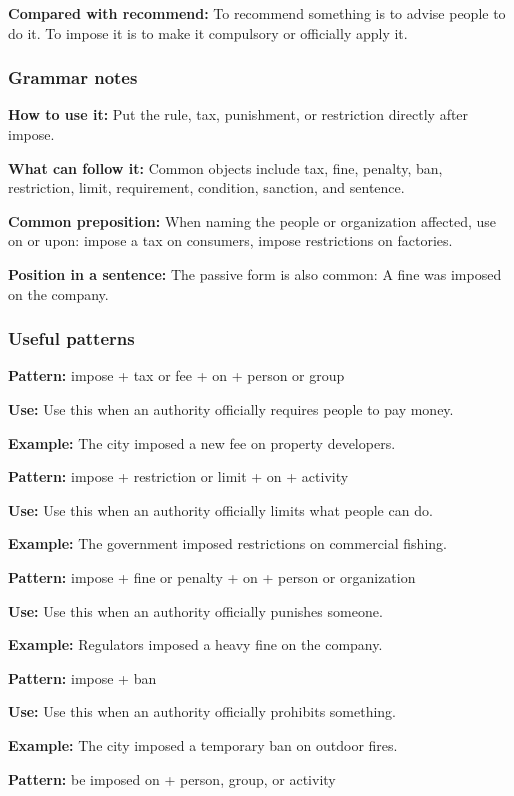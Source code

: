 \documentclass[11pt]{article}
\begin{document}
\textbf{Compared with recommend:} To recommend something is to advise people to do it. To impose it is to make it compulsory or officially apply it.

\subsubsection{Grammar notes}
\textbf{How to use it:} Put the rule, tax, punishment, or restriction directly after impose.

\textbf{What can follow it:} Common objects include tax, fine, penalty, ban, restriction, limit, requirement, condition, sanction, and sentence.

\textbf{Common preposition:} When naming the people or organization affected, use on or upon: impose a tax on consumers, impose restrictions on factories.

\textbf{Position in a sentence:} The passive form is also common: A fine was imposed on the company.

\subsubsection{Useful patterns}
\textbf{Pattern:} impose + tax or fee + on + person or group

\textbf{Use:} Use this when an authority officially requires people to pay money.

\textbf{Example:} The city imposed a new fee on property developers.

\textbf{Pattern:} impose + restriction or limit + on + activity

\textbf{Use:} Use this when an authority officially limits what people can do.

\textbf{Example:} The government imposed restrictions on commercial fishing.

\textbf{Pattern:} impose + fine or penalty + on + person or organization

\textbf{Use:} Use this when an authority officially punishes someone.

\textbf{Example:} Regulators imposed a heavy fine on the company.

\textbf{Pattern:} impose + ban

\textbf{Use:} Use this when an authority officially prohibits something.

\textbf{Example:} The city imposed a temporary ban on outdoor fires.

\textbf{Pattern:} be imposed on + person, group, or activity
\end{document}
